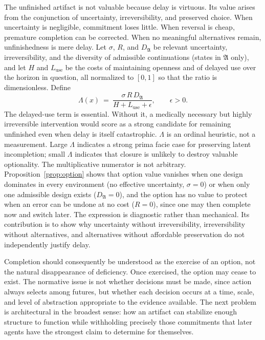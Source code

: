 The unfinished artifact is not valuable because delay is virtuous. Its value arises from the conjunction of uncertainty, irreversibility, and preserved choice. When uncertainty is negligible, commitment loses little. When reversal is cheap, premature completion can be corrected. When no meaningful alternatives remain, unfinishedness is mere delay. Let $\sigma$, $R$, and $D_{\mathfrak{A}}$ be relevant uncertainty, irreversibility, and the diversity of admissible continuations (states in $\mathfrak{A}$ only), and let $H$ and $L_{\mathrm{use}}$ be the costs of maintaining openness and of delayed use over the horizon in question, all normalized to $[0,1]$ so that the ratio is dimensionless. Define
\begin{equation}\label{eq:Lambda}
\Lambda(x)\ =\ \frac{\sigma\,R\,D_{\mathfrak{A}}}{H+L_{\mathrm{use}}+\epsilon},\qquad\epsilon>0.
\end{equation}
The delayed-use term is essential. Without it, a medically necessary but highly irreversible intervention would score as a strong candidate for remaining unfinished even when delay is itself catastrophic. $\Lambda$ is an ordinal heuristic, not a measurement. Large $\Lambda$ indicates a strong prima facie case for preserving latent incompletion; small $\Lambda$ indicates that closure is unlikely to destroy valuable optionality. The multiplicative numerator is not arbitrary. Proposition~\ref{prop:option} shows that option value vanishes when one design dominates in every environment (no effective uncertainty, $\sigma=0$) or when only one admissible design exists ($D_{\mathfrak{A}}=0$), and the option has no value to protect when an error can be undone at no cost ($R=0$), since one may then complete now and switch later. The expression is diagnostic rather than mechanical. Its contribution is to show why uncertainty without irreversibility, irreversibility without alternatives, and alternatives without affordable preservation do not independently justify delay.

Completion should consequently be understood as the exercise of an option, not the natural disappearance of deficiency. Once exercised, the option may cease to exist. The normative issue is not whether decisions must be made, since action always selects among futures, but whether each decision occurs at a time, scale, and level of abstraction appropriate to the evidence available. The next problem is architectural in the broadest sense: how an artifact can stabilize enough structure to function while withholding precisely those commitments that later agents have the strongest claim to determine for themselves.
